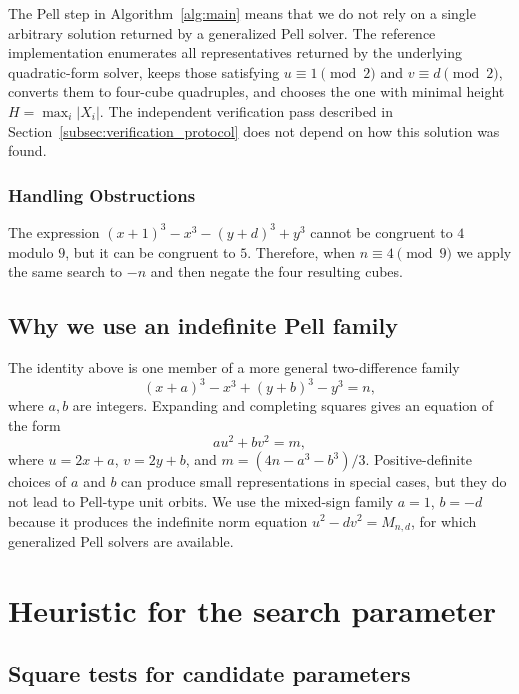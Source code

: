 \documentclass{mcom-l}
\theoremstyle{definition}
\theoremstyle{remark}
\numberwithin{equation}{section}
\begin{document}
The Pell step in Algorithm~\ref{alg:main} means that we do not rely on a
single arbitrary solution returned by a generalized Pell solver.  The
reference implementation enumerates all representatives returned by the
underlying quadratic-form solver, keeps those satisfying
$u\equiv1\pmod2$ and $v\equiv d\pmod2$, converts them to four-cube
quadruples, and chooses the one with minimal height
$H=\max_i|X_i|$.  The independent verification pass described in
Section~\ref{subsec:verification_protocol} does not depend on how this
solution was found.

\subsubsection{Handling Obstructions}
\label{subsubsec:obstructions}

The expression
$(x+1)^3-x^3-(y+d)^3+y^3$ cannot be congruent to $4$ modulo $9$,
but it can be congruent to $5$.  Therefore, when $n\equiv4\pmod9$ we
apply the same search to $-n$ and then negate the four resulting cubes.

\subsection{Why we use an indefinite Pell family}
\label{subsec:necessity}

The identity above is one member of a more general two-difference family
\begin{equation}
(x+a)^3 - x^3 + (y+b)^3 - y^3 = n,
\end{equation}
where $a,b$ are integers.  Expanding and completing squares gives an
equation of the form
\begin{equation}
a u^2 + b v^2 = m,
\end{equation}
where $u=2x+a$, $v=2y+b$, and
$m=(4n-a^3-b^3)/3$.  Positive-definite choices of $a$ and $b$ can produce
small representations in special cases, but they do not lead to Pell-type
unit orbits.  We use the mixed-sign family $a=1$, $b=-d$ because it
produces the indefinite norm equation $u^2-d v^2=M_{n,d}$, for
which generalized Pell solvers are available.

\section{Heuristic for the search parameter}
\label{sec:heuristic}

\subsection{Square tests for candidate parameters}
\label{subsec:square_tests}
\end{document}
